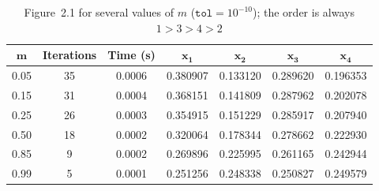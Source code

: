 \begin{table}[H]\centering
\begin{tabular}{ccccccc}
\toprule
$\mathbf{m}$ & \textbf{Iterations} & \textbf{Time (s)} & $\mathbf{x_1}$ & $\mathbf{x_2}$ & $\mathbf{x_3}$ & $\mathbf{x_4}$ \\
\midrule
0.05 & 35 & 0.0006 & 0.380907 & 0.133120 & 0.289620 & 0.196353 \\
0.15 & 31 & 0.0004 & 0.368151 & 0.141809 & 0.287962 & 0.202078 \\
0.25 & 26 & 0.0003 & 0.354915 & 0.151229 & 0.285917 & 0.207940 \\
0.50 & 18 & 0.0002 & 0.320064 & 0.178344 & 0.278662 & 0.222930 \\
0.85 &  9 & 0.0002 & 0.269896 & 0.225995 & 0.261165 & 0.242944 \\
0.99 &  5 & 0.0001 & 0.251256 & 0.248338 & 0.250827 & 0.249579 \\
\bottomrule
\end{tabular}
\caption{Figure~2.1 for several values of $m$ ($\texttt{tol} = 10^{-10}$); the order is always $1>3>4>2$}
\label{tab:ex17-fig21}
\end{table}
